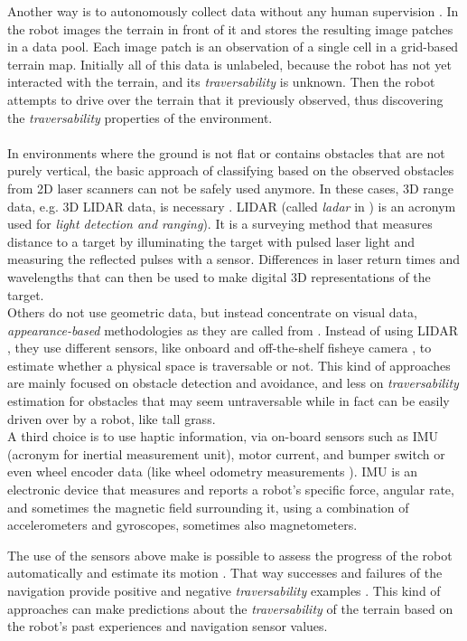 \documentclass[12pt,a4paper]{report}
\newcommand{\term}{\textit}
\newcommand{\acronym}{\MakeUppercase}
\begin{document}
	Another way is to autonomously collect data without any human supervision 
	\cite{Kim, Lee}. In \cite{Kim} the robot images the terrain in front of it and 
	stores the resulting image patches in a data pool. Each image patch is an 
	observation of a single cell in a grid-based terrain map. Initially all of this 
	data is unlabeled, because the robot has not yet interacted with the terrain, and 
	its \term{traversability} is unknown. Then the robot attempts to drive over the 
	terrain that it previously observed, thus discovering the \term{traversability} 
	properties of the environment.
	\\\\
	
	In environments where the ground is not flat or contains obstacles that are 
	not purely vertical, the basic approach of classifying based on the observed 
	obstacles from \acronym{2d} laser scanners can not be safely used anymore. 
	In these cases, \acronym{3d} range data, e.g. \acronym{3d} \acronym{lidar} 
	data, is necessary \cite{Suger, Lalonde}. \acronym{lidar} (called \term{ladar} 
	in \cite{Lalonde, Shneier}) is an acronym used for \term{light detection and 
	ranging}). It is a surveying method that measures distance to a target by 
	illuminating the target with pulsed laser light and measuring the reflected 
	pulses with a sensor. Differences in laser return times and wavelengths that 
	can then be used to make digital \acronym{3d} representations of the target.
	\\
	
	Others do not use geometric data, but instead concentrate on visual data, 
	\term{appearance-based} methodologies as they are called from \cite{Papadakis}. 
	Instead of using \acronym{lidar} \cite{Lalonde, Suger}, they use different 
	sensors, like onboard and off-the-shelf fisheye camera \cite{Hirose}, to 
	estimate whether a physical space is traversable or not. This kind of 
	approaches are mainly focused on obstacle detection and avoidance, and less 
	on \term{traversability} estimation for obstacles that may seem untraversable 
	while in fact can be easily driven over by a robot, like tall grass.
	\\
	
	A third choice is to use haptic information, via on-board sensors such as 
	\acronym{imu} (acronym for inertial measurement unit), motor current, and bumper 
	switch \cite{Kim} or even wheel encoder data \cite{Lee} (like wheel odometry 
	measurements \cite{Droeschel}). \acronym{imu} is an electronic device that 
	measures and reports a robot's specific force, angular rate, and sometimes the 
	magnetic field surrounding it, using a combination of accelerometers and 
	gyroscopes, sometimes also magnetometers. 
	\par
	The use of the sensors above make is possible to assess the progress of the 
	robot automatically and estimate its motion \cite{Droeschel}. That way successes 
	and failures of the navigation provide positive and negative \term{traversability} 
	examples \cite{Kim}. This kind of approaches can make predictions about the 
	\term{traversability} of the terrain based on the robot's past experiences and 
	navigation sensor values.
	\\
	
\end{document}
